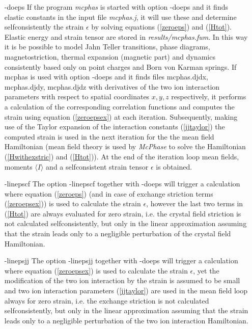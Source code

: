 \begin{itemize}
\item[{\prg -doeps}]
If the program {\em mcphas} is started with option {\prg -doeps}
and it finds elastic constants in the input file {\em mcphas.j}, it
 will use these and determine selfconsistently the strain $\epsilon$ by solving equations
(\ref{zeroeps}) and (\ref{Htot}). Elastic energy and strain tensor are stored in {\em results/mcphas.fum}.
 In this way it is be possible to model Jahn Teller transitions,
phase diagrams, magnetostriction, thermal expansion (magnetic part) and dynamics consistently based
only on point charges and Born von Karman springs. 
If {\prg mcphas} is used with option {\prg -doeps} and it finds files {\prg mcphas.djdx}, {\prg mcphas.djdy}, {\prg mcphas.djdz} with
derivatives of the two ion interaction parameters with respect to
spatial coordinates $x,y,z$ respectively, it performs a calculation of
the corresponding correlation functions and computes the strain  using
equation (\ref{zeroepsex}) at each iteration. Subsequently, making use of the Taylor expansion
of the interaction constants (\ref{jjtaylor}) the computed strain is used 
in the next iteration for the the mean field Hamiltonian 
(mean field theory is used by {\em McPhase}
to solve the Hamiltonian (\ref{Hwithexstric}) and (\ref{Htot})). 
At the end of the iteration loop mean fields, moments $\langle I \rangle$ and 
a selfconsistent strain tensor $\epsilon$ is obtained.
 
\item[{\prg -linepscf}]
The option {\prg -linepscf} together with {\prg -doeps} will trigger 
a calculation where equation (\ref{zeroeps}) (and in case
of exchange striction terms (\ref{zeroepsex}))
is used to calculate the strain $\epsilon$, however the last two terms in
(\ref{Htot}) are always evaluated
for zero strain, i.e. the crystal field striction is not calculated
selfconsistently, but only in the linear approximation assuming that the 
strain leads only to a negligible perturbation of the crystal field
Hamiltonian. 

\item[{\prg -linepsjj}]
The option {\prg -linepsjj} together with {\prg -doeps} will trigger 
a calculation where equation (\ref{zeroepsex})
is used to calculate the strain $\epsilon$, yet the modification of
the two ion interaction by the strain is assumed to be small
and two ion interaction parameters (\ref{jjtaylor}) are used
in the mean field loop always for zero strain, i.e. the exchange striction is not calculated
selfconsistently, but only in the linear approximation assuming that the 
strain leads only to a negligible perturbation of the two ion interaction
Hamiltonian.


\end{itemize}


